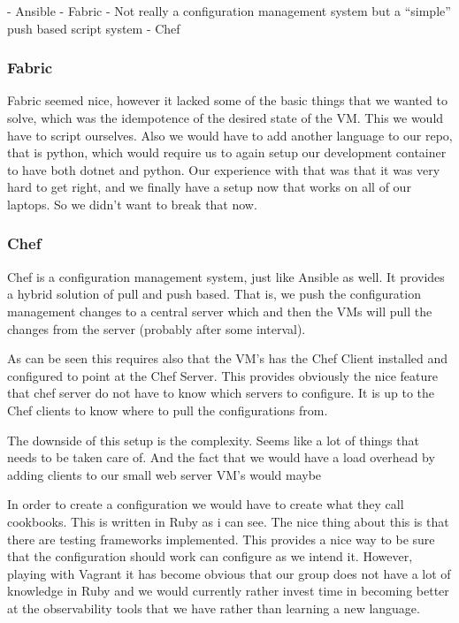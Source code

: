 - Ansible
- Fabric - Not really a configuration management system but a “simple” push based script system
- Chef

\subsubsection{Fabric}

Fabric seemed nice, however it lacked some of the basic things that we wanted to solve, which was the idempotence of the desired state of the VM. This we would have to script ourselves. Also we would have to add another language to our repo, that is python, which would require us to again setup our development container to have both dotnet and python. Our experience with that was that it was very hard to get right, and we finally have a setup now that works on all of our laptops. So we didn’t want to break that now.

\subsubsection{Chef}

Chef is a configuration management system, just like Ansible as well. It provides a hybrid solution of pull and push based. That is, we push the configuration management changes to a central server which and then the VMs will pull the changes from the server (probably after some interval).

As can be seen this requires also that the VM’s has the Chef Client installed and configured to point at the Chef Server. This provides obviously the nice feature that chef server do not have to know which servers to configure. It is up to the Chef clients to know where to pull the configurations from.

The downside of this setup is the complexity. Seems like a lot of things that needs to be taken care of. And the fact that we would have a load overhead by adding clients to our small web server VM’s would maybe

In order to create a configuration we would have to create what they call cookbooks. This is written in Ruby as i can see. The nice thing about this is that there are testing frameworks implemented. This provides a nice way to be sure that the configuration should work can configure as we intend it. However, playing with Vagrant it has become obvious that our group does not have a lot of knowledge in Ruby and we would currently rather invest time in becoming better at the observability tools that we have rather than learning a new language.

